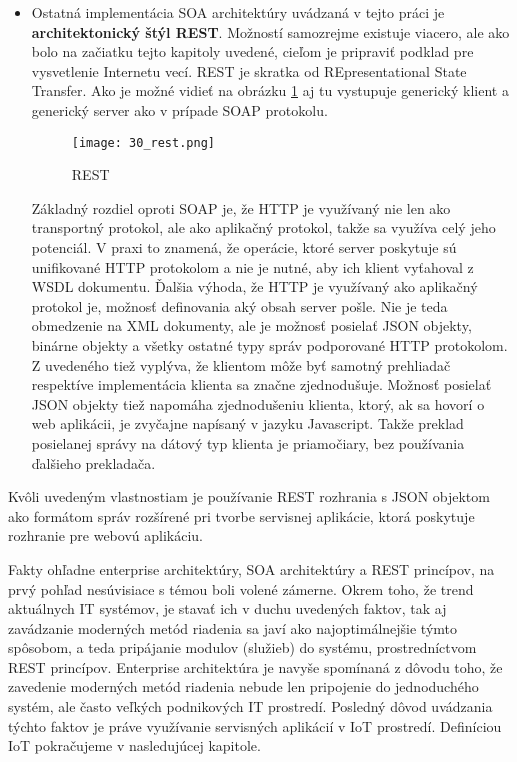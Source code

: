 \begin{itemize}
 \item Ostatná implementácia SOA architektúry uvádzaná v tejto práci je \textbf{architektonický štýl REST}. Možností samozrejme existuje viacero, ale ako bolo na začiatku tejto kapitoly uvedené, cieľom je pripraviť podklad pre vysvetlenie Internetu vecí. REST je skratka od REpresentational State Transfer. Ako je možné vidieť na obrázku \ref{30_rest} aj tu vystupuje generický klient a generický server ako v prípade SOAP protokolu.
\begin{figure}[!htbp]
\centering
\texttt{[image: 30\_rest.png]}
\caption{REST \cite{IOT14}}
\label{30_rest}
\end{figure} 
Základný rozdiel oproti SOAP je, že HTTP je využívaný nie len ako transportný protokol, ale ako aplikačný protokol, takže sa využíva celý jeho potenciál. V praxi to znamená, že operácie, ktoré server poskytuje sú unifikované HTTP protokolom a nie je nutné, aby ich klient vyťahoval z WSDL dokumentu. Ďalšia výhoda, že HTTP je využívaný ako aplikačný protokol je, možnosť definovania aký obsah server pošle. Nie je teda obmedzenie na XML dokumenty, ale je možnosť posielať JSON objekty, binárne objekty a všetky ostatné typy správ podporované HTTP protokolom. Z uvedeného tiež vyplýva, že klientom môže byť samotný prehliadač respektíve implementácia klienta sa značne zjednodušuje. Možnosť posielať JSON objekty tiež napomáha zjednodušeniu klienta, ktorý, ak sa hovorí o web aplikácii, je zvyčajne napísaný v jazyku Javascript. Takže preklad posielanej správy na dátový typ klienta je priamočiary, bez používania ďalšieho prekladača. 
\end{itemize}
Kvôli uvedeným vlastnostiam je používanie REST rozhrania s JSON objektom ako formátom správ rozšírené pri tvorbe servisnej aplikácie, ktorá poskytuje rozhranie pre webovú aplikáciu.

\indent Fakty ohľadne enterprise architektúry, SOA architektúry a REST princípov, na prvý pohľad nesúvisiace s témou boli volené zámerne. Okrem toho, že trend aktuálnych IT systémov, je stavať ich v duchu uvedených faktov, tak aj zavádzanie moderných metód riadenia sa javí ako najoptimálnejšie týmto spôsobom, a teda pripájanie modulov (služieb) do systému, prostredníctvom REST princípov. Enterprise architektúra je navyše spomínaná z dôvodu toho, že zavedenie moderných metód riadenia nebude len pripojenie do jednoduchého systém, ale často veľkých podnikových IT prostredí. Posledný dôvod uvádzania týchto faktov je práve využívanie servisných aplikácií v IoT prostredí. Definíciou IoT pokračujeme v nasledujúcej kapitole.

